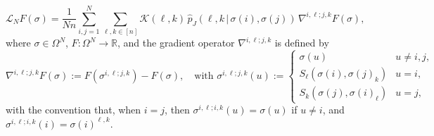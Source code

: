 \documentclass[11pt,reqno]{amsart}
\numberwithin{equation}{section}
\numberwithin{figure}{section}
\newcommand{\1}{\mathds{1}}
\newcommand{\tc}{\,|\,}
\let\si=\sigma
\let\O=\Omega
\newcommand{\cA}{\ensuremath{\mathcal A}}
\newcommand{\cK}{\ensuremath{\mathcal K}}
\begin{document}
%
\begin{equation}\label{particles system generator}
\mathcal{L}_N F(\sigma) = \frac{1}{Nn} \sum_{i,j=1}^N \sum_{\ell,k \in [n]} \cK(\ell,k) \,\hat p_J(\ell,k\tc\si(i),\si(j)) \,\nabla^{i,\ell;j,k} F(\sigma),
\end{equation}
where $\si\in\O^N$,  \(F: \Omega^N \to \mathbb{R}\), and the gradient operator \(\nabla^{i,\ell;j,k}\) is defined by
\begin{equation}\label{eq:unde}
\nabla^{i,\ell;j,k}F(\sigma) := F(\sigma^{i,\ell;j,k}) - F(\sigma), \quad \text{with } \sigma^{i,\ell;j,k}(u) := \begin{cases}
\sigma(u) & u \neq i,j, \\
S_\ell(\sigma(i), \sigma(j)_k) & u = i, \\
S_k(\sigma(j), \sigma(i)_\ell) & u = j,
\end{cases}
\end{equation}
with the convention that, when  $i= j$, then $\sigma^{i,\ell;i,k}(u)=\sigma(u)$ if $ u \neq i$, and $\sigma^{i,\ell;i,k}(i)=\si(i)^{\ell,k}$. 
\end{document}
